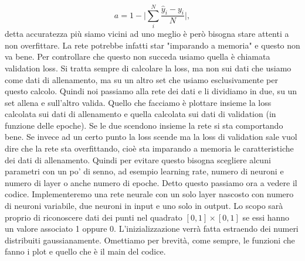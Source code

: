 \documentclass[10pt,a4paper]{article}
\begin{document}
\begin{equation}
a = 1 - \Bigg| \sum_i^N \frac{\hat{y}_i - y_i}{N} \Bigg| ,
\end{equation}
detta accuratezza più siamo vicini ad uno meglio è però bisogna stare attenti a non overfittare. La rete potrebbe infatti star "imparando a memoria" e questo non va bene. Per controllare che questo non succeda usiamo quella è chiamata validation loss. Si tratta sempre di calcolare la loss, ma non sui dati che usiamo come dati di allenamento, ma su un altro set che usiamo esclusivamente per questo calcolo. Quindi noi passiamo alla rete dei dati e li dividiamo in due, su un set allena e sull'altro valida. Quello che facciamo è plottare insieme la loss calcolata sui dati di allenamento e quella calcolata sui dati di validation (in funzione delle epoche). Se le due scendono insieme la rete si sta comportando bene. Se invece ad un certo punto la loss scende ma la loss di validation sale vuol dire che la rete sta overfittando, cioè sta imparando a memoria le caratteristiche dei dati di allenamento. Quindi per evitare questo bisogna scegliere alcuni parametri con un po' di senno, ad esempio learning rate, numero di neuroni e numero di layer o anche numero di epoche. 
Detto questo passiamo ora a vedere il codice. Implementeremo una rete neurale con un solo layer nascosto con numero di neuroni variabile, due neuroni in input e uno solo in output. Lo scopo sarà proprio di riconoscere dati dei punti nel quadrato $[0, 1] \times [0, 1]$ se essi hanno un valore associato 1 oppure 0. L'inizializzazione verrà fatta estraendo dei numeri distribuiti gaussianamente. Omettiamo per brevità, come sempre, le funzioni che fanno i plot e quello che è il main del codice.
\end{document}

